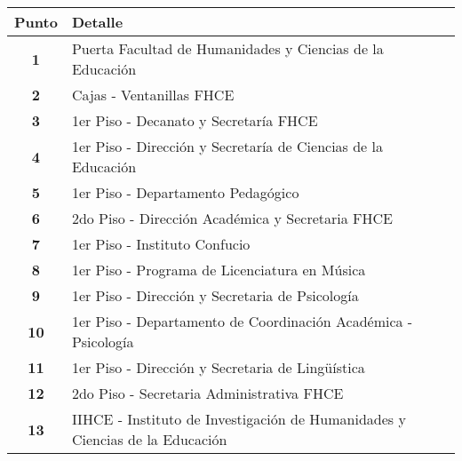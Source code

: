    \begin{longtable}{ c  X }
      \toprule
        \textbf{Punto} &
        \textbf{Detalle}\\

      \midrule
\endhead

        \textbf{1}
        &
        Puerta Facultad de Humanidades y Ciencias de la Educación
        \\

  \addlinespace
  \textbf{2}
  &
  Cajas - Ventanillas FHCE
  \\

  \addlinespace
  \textbf{3}
  &
  1{\tiny er} Piso - Decanato y Secretaría FHCE
  \\

  \addlinespace
  \textbf{4}
  &
  1{\tiny er} Piso - Dirección y Secretaría de Ciencias de la Educación
  \\


\addlinespace
\textbf{5}
&
1{\tiny er} Piso - Departamento Pedagógico
\\

\addlinespace
\textbf{6}
&
2{\tiny do} Piso - Dirección Académica y Secretaria FHCE
\\

\addlinespace
\textbf{7}
&
1{\tiny er} Piso - Instituto Confucio
\\


\addlinespace
\textbf{8}
&
1{\tiny er} Piso - Programa de Licenciatura en Música
\\


\addlinespace
\textbf{9}
&
1{\tiny er} Piso - Dirección y Secretaria de Psicología
\\


\addlinespace
\textbf{10}
&
1{\tiny er} Piso - Departamento de Coordinación Académica - Psicología
\\

\addlinespace
\textbf{11}
&
1{\tiny er} Piso - Dirección y Secretaria de Lingüística
\\

\addlinespace
\textbf{12}
&
2{\tiny do} Piso - Secretaria Administrativa FHCE
\\



\addlinespace
\textbf{13}
&
IIHCE - Instituto de Investigación de Humanidades y Ciencias de la Educación
\\



\end{longtable}
